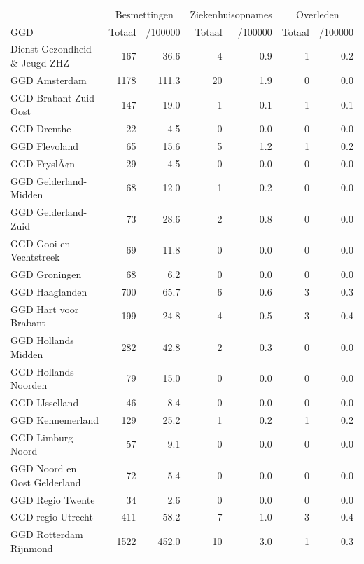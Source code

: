 \documentclass[
  english,
  man,floatsintext]{apa6}
\begin{document}
\begin{table}[H]
\centering\begingroup\fontsize{10}{12}\selectfont

\begin{threeparttable}
\begin{tabular}{lrrrrrr}
\toprule
\multicolumn{1}{c}{ } & \multicolumn{2}{c}{Besmettingen} & \multicolumn{2}{c}{Ziekenhuisopnames} & \multicolumn{2}{c}{Overleden} \\
\cmidrule(l{3pt}r{3pt}){2-3} \cmidrule(l{3pt}r{3pt}){4-5} \cmidrule(l{3pt}r{3pt}){6-7}
GGD & Totaal & /100000 & Totaal & /100000 & Totaal & /100000\\
\midrule
Dienst Gezondheid \& Jeugd ZHZ & 167 & 36.6 & 4 & 0.9 & 1 & 0.2\\
GGD Amsterdam & 1178 & 111.3 & 20 & 1.9 & 0 & 0.0\\
GGD Brabant Zuid-Oost & 147 & 19.0 & 1 & 0.1 & 1 & 0.1\\
GGD Drenthe & 22 & 4.5 & 0 & 0.0 & 0 & 0.0\\
GGD Flevoland & 65 & 15.6 & 5 & 1.2 & 1 & 0.2\\
GGD FryslÃ¢n & 29 & 4.5 & 0 & 0.0 & 0 & 0.0\\
GGD Gelderland-Midden & 68 & 12.0 & 1 & 0.2 & 0 & 0.0\\
GGD Gelderland-Zuid & 73 & 28.6 & 2 & 0.8 & 0 & 0.0\\
GGD Gooi en Vechtstreek & 69 & 11.8 & 0 & 0.0 & 0 & 0.0\\
GGD Groningen & 68 & 6.2 & 0 & 0.0 & 0 & 0.0\\
GGD Haaglanden & 700 & 65.7 & 6 & 0.6 & 3 & 0.3\\
GGD Hart voor Brabant & 199 & 24.8 & 4 & 0.5 & 3 & 0.4\\
GGD Hollands Midden & 282 & 42.8 & 2 & 0.3 & 0 & 0.0\\
GGD Hollands Noorden & 79 & 15.0 & 0 & 0.0 & 0 & 0.0\\
GGD IJsselland & 46 & 8.4 & 0 & 0.0 & 0 & 0.0\\
GGD Kennemerland & 129 & 25.2 & 1 & 0.2 & 1 & 0.2\\
GGD Limburg Noord & 57 & 9.1 & 0 & 0.0 & 0 & 0.0\\
GGD Noord en Oost Gelderland & 72 & 5.4 & 0 & 0.0 & 0 & 0.0\\
GGD Regio Twente & 34 & 2.6 & 0 & 0.0 & 0 & 0.0\\
GGD regio Utrecht & 411 & 58.2 & 7 & 1.0 & 3 & 0.4\\
GGD Rotterdam Rijnmond & 1522 & 452.0 & 10 & 3.0 & 1 & 0.3\\

\end{tabular}
\end{threeparttable}
\end{table}
\end{document}

